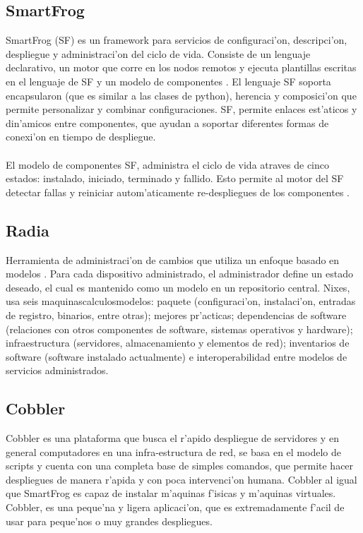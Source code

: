 \subsection{SmartFrog}
SmartFrog (SF) es un framework para servicios de configuraci'on, descripci'on, despliegue y administraci'on del ciclo de vida. Consiste de un lenguaje declarativo, un motor que corre en los nodos remotos y ejecuta plantillas escritas en el lenguaje de SF y un modelo de componentes \cite{3}. El lenguaje SF soporta encapsularon (que es similar a las clases de python), herencia y composici'on que permite personalizar y combinar configuraciones. SF, permite enlaces est'aticos y din'amicos entre componentes, que ayudan a soportar diferentes formas de conexi'on en tiempo de despliegue.\\
\\
El modelo de componentes SF, administra el ciclo de vida atraves de cinco estados: instalado, iniciado, terminado y fallido. Esto permite al motor del SF detectar fallas y reiniciar autom'aticamente re-despliegues de los componentes \cite{11}.

\subsection{Radia}
Herramienta de administraci'on de cambios que utiliza un enfoque basado en modelos \cite{5}. Para cada dispositivo administrado, el administrador define un estado deseado, el cual es mantenido como un modelo en un repositorio central. Nixes, usa seis maquinascalculosmodelos: paquete (configuraci'on, instalaci'on, entradas de registro, binarios, entre otras); mejores pr'acticas; dependencias de software (relaciones con otros componentes de software, sistemas operativos y hardware); infraestructura (servidores, almacenamiento y elementos de red); inventarios de software (software instalado actualmente) e interoperabilidad entre modelos de servicios administrados. 

\subsection{Cobbler}
Cobbler es una plataforma que busca el r'apido despliegue de servidores y en general computadores en una infra-estructura de red, se basa en el modelo de scripts y cuenta con una completa base de simples comandos, que permite hacer despliegues de manera r'apida y con poca intervenci'on humana. Cobbler al igual que SmartFrog es capaz de instalar m'aquinas f'isicas y m'aquinas virtuales. Cobbler, es una peque'na y ligera aplicaci'on, que es extremadamente f'acil de usar para peque'nos o muy grandes despliegues. \cite{6}

